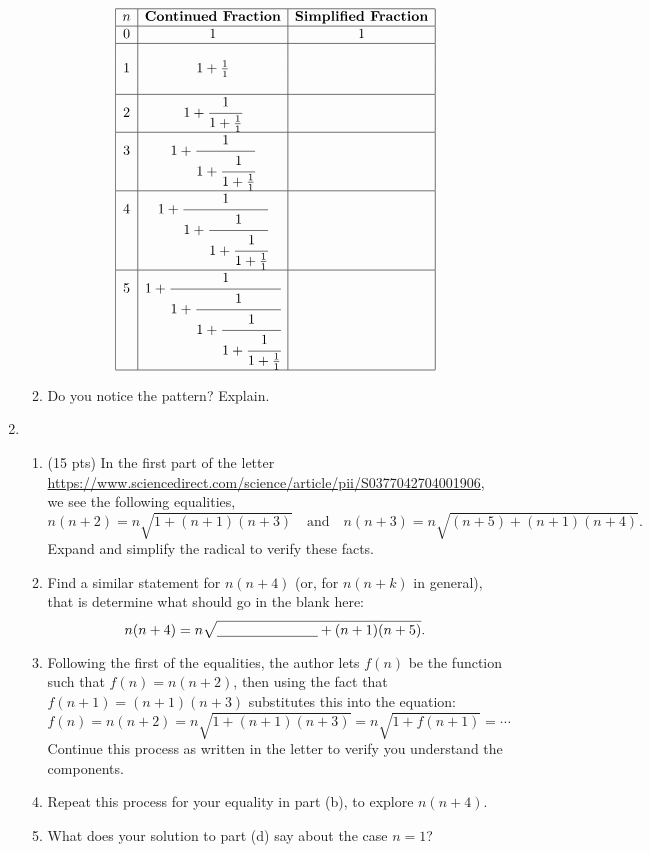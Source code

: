 \documentclass[12pt]{article}
\begin{document}
\begin{enumerate}
\begin{enumerate}
			 	$$\begin{array}{|c|c|c|}
			 	\hline
			 	n&\textbf{Continued Fraction}&\textbf{Simplified Fraction}\\\hline
			 	0 & 1& 1\\\hline&&\\
			 	1 & 1+\frac{1}{1}&\\&&\\\hline
			 	2 & 1+\cfrac{1}{1+\frac{1}{1}}&\\\hline
			 	3 & 1+\cfrac{1}{1+\cfrac{1}{1+\frac{1}{1}}}&\\\hline
			 	4 & 1+\cfrac{1}{1+\cfrac{1}{1+\cfrac{1}{1+\frac{1}{1}}}}&\\\hline
			 	5 & 1+\cfrac{1}{1+\cfrac{1}{1+\cfrac{1}{1+\cfrac{1}{1+\frac{1}{1}}}}}&\\\hline
			 	\end{array}$$
			 \item Do you notice the pattern? Explain. 
		\end{enumerate}
	\newpage
	\item 
	\begin{enumerate}
		\item (15 pts) In the first part of the letter \url{https://www.sciencedirect.com/science/article/pii/S0377042704001906}, we see the following equalities,
			$$
			n(n+2)=n\sqrt{1+(n+1)(n+3)}
			\quad\text{and}\quad
			n(n+3)=n\sqrt{(n+5)+(n+1)(n+4)}.
			$$
		Expand and simplify the radical to verify these facts.
		\vfill
		\item Find a similar statement for $n(n+4)$ (or, for $n(n+k)$ in general), that is determine what should go in the blank here:			$$n(n+4)=n\sqrt{\underline{\hspace*{1in}}+(n+1)(n+5)}.$$
		\vfill
		\item Following the first of the equalities, the author lets $f(n)$ be the function such that $f(n)=n(n+2)$, then using the fact that $f(n+1)=(n+1)(n+3)$ substitutes this into the equation:	\[f(n)=n(n+2)=n\sqrt{1+(n+1)(n+3)}=n\sqrt{1+f(n+1)}=\cdots\]
		Continue this process as written in the letter to verify you understand the components.\vfill
		\newpage
		\item Repeat this process for your equality in part (b), to explore $n(n+4)$.\vfill
		\item What does your solution to part (d) say about the case $n=1$?\vskip 1in
	\end{enumerate}
	\end{enumerate}
\end{document}
